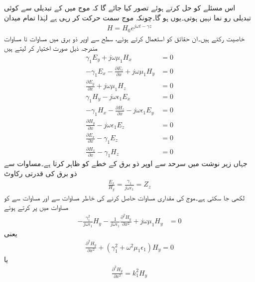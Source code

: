 اس مسئلے کو حل کرتے ہوئے تصور کیا جائے گا کہ موج میں   کے تبدیلی سے کوئی تبدیلی رو نما نہیں ہوتی۔یوں  ہو گا۔چونکہ موج  سمت حرکت کر رہی ہے لہٰذا تمام میدان
\begin{align}\label{مساوات_مویج_حرکت_کرتی_موج_عمومی}
H=H_0 e^{j\omega t -\gamma z}
\end{align}
خاصیت رکتے ہیں۔ان حقائق کو استعمال کرتے ہوئے، سطح سے اوپر ذو برق میں مساوات  تا مساوات  مندرجہ ذیل صورت اختیار کر لیتے ہیں
\begin{align}
\gamma_1  E_y+j\omega \mu_1 H_x&=0 \label{مساوات_مویج_سطح_الف}\\
-\gamma_1  E_x-\frac{\partial E_z}{\partial x}+j\omega\mu_1  H_y&=0 \label{مساوات_مویج_سطح_ب}\\
\frac{\partial E_y}{\partial x}+j\omega\mu_1  H_z&=0 \label{مساوات_مویج_سطح_پ}\\
\gamma_1 H_y-j\omega\epsilon_1  E_x&=0 \label{مساوات_مویج_سطح_ت}\\
-\gamma_1 H_x-\frac{\partial H_z}{\partial x}-j\omega\epsilon_1  E_y&=0 \label{مساوات_مویج_سطح_ٹ}\\
\frac{\partial H_y}{\partial x}-j\omega\epsilon_1 E_z&=0 \label{مساوات_مویج_سطح_ث}\\
\frac{\partial E_x}{\partial x}-\gamma_1  E_z&=0\label{مساوات_مویج_سطح_ج}\\
\frac{\partial H_x}{\partial x}-\gamma_1  H_z&=0 \label{مساوات_مویج_سطح_چ}
\end{align}
جہاں زیر نوشت میں  سرحد سے اوپر ذو برق کے خطے کو ظاہر کرتا ہے۔مساوات  سے ذو برق کی قدرتی رکاوٹ 
\begin{align}\label{مساوات_مویج_ذو_برق_قدرتی_رکاوٹ}
\frac{E_x}{H_y}=\frac{\gamma_1}{j\omega \epsilon_1}=Z_z
\end{align}
لکھی جا سکتی ہے۔موج کی مقداری مساوات  حاصل کرنے کی خاطر مساوات  سے  اور مساوات  سے  کو مساوات  میں پر کرتے ہوئے
\begin{align*}
-\frac{\gamma_1^2}{j\omega \epsilon_1}  H_y-\frac{1}{j\omega \epsilon_1}\frac{\partial^2 H_y}{\partial x^2}+j\omega\mu_1  H_y&=0
\end{align*}
یعنی
\begin{align*}
\frac{\partial^2 H_y}{\partial x^2}+\left(\gamma_1^2+\omega^2 \mu_1 \epsilon_1 \right) H_y=0
\end{align*}
یا
\begin{align}\label{مساوات_مویج_سطح_ذو_برق_موج}
\frac{\partial^2 H_y}{\partial x^2}= k_1^2H_y
\end{align}
